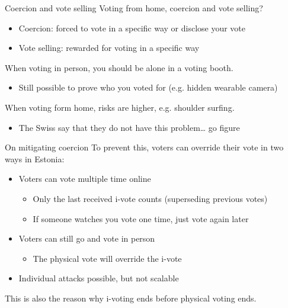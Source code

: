 \begin{frame}{Coercion and vote selling}
  Voting from home, coercion and vote selling?
  \begin{itemize}[<+(1)->]
    \item Coercion: forced to vote in a specific way or disclose your vote
    \item Vote selling: rewarded for voting in a specific way
  \end{itemize}

  \vspace*{1em}

  \pause
  When voting in person, you should be alone in a voting booth.
  \begin{itemize}[<+(1)->]
    \item Still possible to prove who you voted for (e.g. hidden wearable camera)
  \end{itemize}

  \vspace*{1em}

  \pause
  When voting form home, risks are higher, e.g. shoulder surfing.
  \begin{itemize}[<+(1)->]
    \item The Swiss say that they do not have this problem\dots{} go figure
  \end{itemize}
\end{frame}

\begin{frame}{On mitigating coercion}
  To prevent this, voters can override their vote in two ways in Estonia:
  \begin{itemize}[<+(1)->]
    \item Voters can vote multiple time online
    \begin{itemize}
      \item Only the last received i-vote counts (superseding previous votes)
      \item If someone watches you vote one time, just vote again later
    \end{itemize}
    \item Voters can still go and vote in person
    \begin{itemize}
      \item The physical vote will override the i-vote
    \end{itemize}
    \item Individual attacks possible, but not scalable
  \end{itemize}

  \pause
  This is also the reason why i-voting ends before physical voting ends.
\end{frame}

